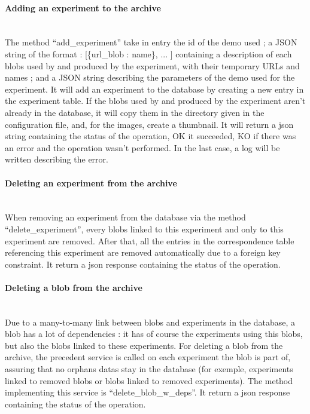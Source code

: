\paragraph{Adding an experiment to the archive} \hspace{0pt} \\
The method ``add\_experiment'' take in entry the id of the demo used ; a JSON string of the format : [\{url\_blob : name\}, ... ] containing a description of each blobs used by and produced by the experiment, with their temporary URLs and names ; and a JSON string describing the parameters of the demo used for the experiment. It will add an experiment to the database by creating a new entry in the experiment table. If the blobs used by and produced by the experiment aren't already in the database, it will copy them in the directory given in the configuration file, and, for the images, create a thumbnail. It will return a json string containing the status of the operation, OK it succeeded, KO if there was an error and the operation wasn't performed. In the last case, a log will be written describing the error.

\paragraph{Deleting an experiment from the archive} \hspace{0pt} \\
When removing an experiment from the database via the method ``delete\_experiment'', every blobs linked to this experiment and only to this experiment are removed. After that, all the entries in the correspondence table referencing this experiment are removed automatically due to a foreign key constraint. It return a json response containing the status of the operation.

\paragraph{Deleting a blob from the archive} \hspace{0pt} \\
Due to a many-to-many link between blobs and experiments in the database, a blob has a lot of dependencies : it has of course the experiments using this blobs, but also the blobs linked to these experiments. For deleting a blob from the archive, the precedent service is called on each experiment the blob is part of, assuring that no orphans datas stay in the database (for exemple, experiments linked to removed blobs or blobs linked to removed experiments). The method implementing this service is ``delete\_blob\_w\_deps''. It return a json response containing the status of the operation.

